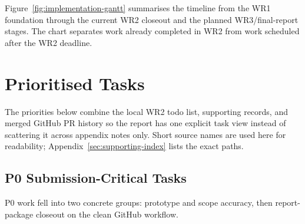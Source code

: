 Figure~\ref{fig:implementation-gantt} summarises the timeline from the WR1 foundation through the current WR2 closeout and the planned WR3/final-report stages. The chart separates work already completed in WR2 from work scheduled after the WR2 deadline.

\section{Prioritised Tasks}

The priorities below combine the local WR2 todo list, supporting records, and merged GitHub PR history so the report has one explicit task view instead of scattering it across appendix notes only. Short source names are used here for readability; Appendix~\ref{sec:supporting-index} lists the exact paths.

\providecommand{\taskcell}[2]{\parbox[t]{#1}{\RaggedRight #2}}

\subsection{P0 Submission-Critical Tasks}

P0 work fell into two concrete groups: prototype and scope accuracy, then report-package closeout on the clean GitHub workflow.


